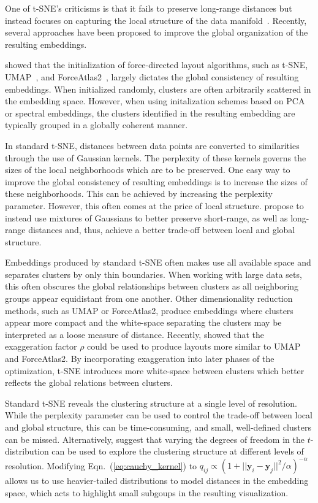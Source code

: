 \documentclass[article]{jss}
\begin{document}
One of t-SNE's criticisms is that it fails to preserve long-range distances but
instead focuses on capturing the local structure of the
data manifold~\citep{becht2019dimensionality}. Recently, several approaches have been
proposed to improve the global organization of the resulting embeddings.

\citet{kobak2019umap} showed that the initialization of force-directed layout
algorithms, such as t-SNE, UMAP~\citep{2018arXivUMAP}, and ForceAtlas2~\citep{jacomy2014forceatlas2}, largely dictates the global
consistency of resulting embeddings. When initialized randomly, clusters are
often arbitrarily scattered in the embedding space. However, when using
initalization schemes based on PCA or spectral embeddings, the clusters
identified in the resulting embedding are typically grouped in a globally
coherent manner.

In standard t-SNE, distances between data points are converted to similarities
through the use of Gaussian kernels. The perplexity of these kernels governs the
sizes of the local neighborhoods which are to be preserved. One easy way to
improve the global consistency of resulting embeddings is to increase the sizes
of these neighborhoods. This can be achieved by increasing the perplexity
parameter. However, this often comes at the price of local structure.
\citet{kobak2019art} propose to instead use mixtures of Gaussians to better
preserve short-range, as well as long-range distances and, thus, achieve a
better trade-off between local and global structure.

Embeddings produced by standard t-SNE often makes use all available space and
separates clusters by only thin boundaries. When working with large data sets,
this often obscures the global relationships between clusters as all neighboring
groups appear equidistant from one another.  Other dimensionality reduction
methods, such as UMAP or
ForceAtlas2, produce embeddings where clusters
appear more compact and the white-space separating the clusters may be
interpreted as a loose measure of distance. Recently, \citet{bohm2020unifying}
showed that the exaggeration factor $\rho$ could be used to produce layouts more
similar to UMAP and ForceAtlas2. By incorporating exaggeration into later phases
of the optimization, t-SNE introduces more white-space between clusters which better
reflects the global relations between clusters.

Standard t-SNE reveals the clustering structure at a single level of resolution.
While the perplexity parameter can be used to control the trade-off between
local and global structure, this can be time-consuming, and small, well-defined
clusters can be missed. Alternatively, \citet{kobak2019heavy} suggest that
varying the degrees of freedom in the $t$-distribution can be used to explore
the clustering structure at different levels of resolution. Modifying
Eqn.~(\ref{eq:cauchy_kernel}) to $q_{ij} \propto \left ( 1 + || \mathbf{y}_i -
\mathbf{y}_j ||^2 / \alpha \right )^{-\alpha}$ allows us to use heavier-tailed
distributions to model distances in the embedding space, which acts to highlight
small subgoups in the resulting visualization.
\end{document}
